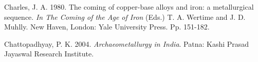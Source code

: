 \begin{thebibliography}{99}
 Charles, J. A. 1980. The coming of copper-base alloys and iron: a metallurgical sequence. \textit{In The Coming of the Age of Iron} (Eds.) T. A. Wertime and J. D. Muhlly. New Haven, London: Yale University Press. Pp. 151­-182. 

 Chattopadhyay, P. K. 2004. \textit{Archaeometallurgy in India}. Patna: Kashi Prasad Jayaswal Research Institute.



\end{thebibliography}


\label{endchapter8}
